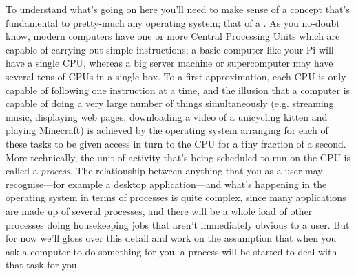 To understand what's going on here you'll need to make sense of a concept that's fundamental to pretty-much any operating system; that of a . As you no-doubt know, modern computers have one or more Central Processing Units which are capable of carrying out simple instructions; a basic computer like your Pi will have a single CPU, whereas a big server machine or supercomputer may have several tens of CPUs in a single box. To a first approximation, each CPU is only capable of following one instruction at a time, and the illusion that a computer is capable of doing a very large number of things simultaneously (e.g. streaming music, displaying web pages, downloading a video of a unicycling kitten and playing Minecraft) is achieved by the operating system arranging for each of these tasks to be given access in turn to the CPU for a tiny fraction of a second. More technically, the unit of activity that's being scheduled to run on the CPU is called a \textit{process}. The relationship between anything that you as a user may recognise---for example a desktop application---and what's happening in the operating system in terms of processes is quite complex, since many applications are made up of several processes, and there will be a whole load of other processes doing housekeeping jobs that aren't immediately obvious to a user. But for now we'll gloss over this detail and work on the assumption that when you ask a computer to do something for you, a process will be started to deal with that task for you. 

